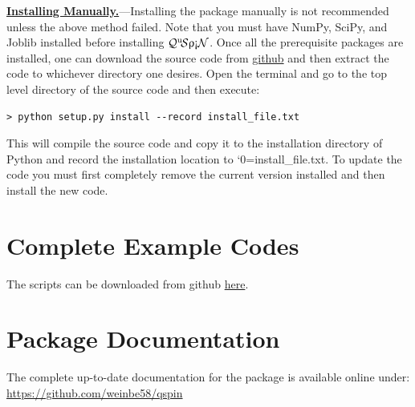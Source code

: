\documentclass{SciPost}
\newcommand\0{\scalebox{-1}[1]{0}}
\let\svttfamily\ttfamily
\renewcommand\ttfamily{\svttfamily\catcode`0=\active }
\renewcommand\texttt{\bgroup\ttfamily\texttthelp}
\def\texttthelp#1{#1\egroup}
\newcommand{\qspin}{$\mathcal{Q}^{\mathrm{u}}\!\mathcal{S}\uprho\mathrm{\text{\textexclamdown}}\mathcal{N}$}
\begin{document}
\begin{appendix}
\underline{\bf Installing Manually.}---Installing the package manually is not recommended unless the above method failed. Note that you must have NumPy, SciPy, and Joblib installed before installing \qspin. Once all the prerequisite packages are installed, one can download the source code from \href{https://github.com/weinbe58/qspin/tree/master}{github} and then extract the code to whichever directory one desires. Open the terminal and go to the top level directory of the source code and then execute:  
\begin{lstlisting}[numbers=none]
> python setup.py install --record install_file.txt
\end{lstlisting}
This will compile the source code and copy it to the installation directory of Python and record the installation location to \texttt{install\_file.txt}. To update the code you must first completely remove the current version installed and then install the new code. 


\newpage
\section{Complete Example Codes}
The scripts can be downloaded from github \href{https://github.com/weinbe58/qspin_paper/tree/master/scripts}{here}.
\label{app:scripts}

\newpage

\newpage



\section{Package Documentation}
\label{app:doc}
The complete up-to-date documentation for the package is available online under:\\

\href{https://github.com/weinbe58/qspin}{https://github.com/weinbe58/qspin}\\

\end{appendix}


%
%

\nolinenumbers
\end{document}
